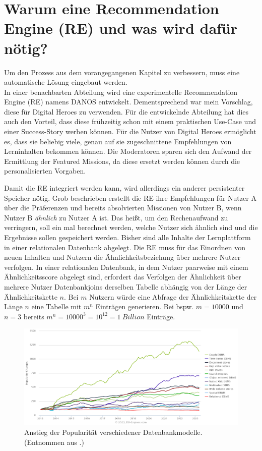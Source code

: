 \chapter{Warum eine Recommendation Engine (RE) und was wird dafür nötig?}

Um den Prozess aus dem vorangegangenen Kapitel zu verbessern, 
muss eine automatische Lösung eingebaut werden. \\
In einer benachbarten Abteilung wird eine experimentelle Recommendation Engine (RE) 
namens DANOS entwickelt. Dementsprechend war mein Vorschlag, 
diese für Digital Heroes zu verwenden. Für die entwickelnde Abteilung 
hat dies auch den Vorteil, dass diese frühzeitig schon mit einem praktischen Use-Case 
und einer Success-Story werben können. Für die Nutzer von Digital Heroes 
ermöglicht es, dass sie beliebig viele, genau auf sie zugeschnittene Empfehlungen 
von Lerninhalten bekommen können. Die Moderatoren sparen sich den Aufwand 
der Ermittlung der Featured Missions, da diese ersetzt werden können durch die 
personalisierten Vorgaben. 

Damit die RE integriert werden kann, wird allerdings ein anderer persistenter Speicher nötig.
Grob beschrieben erstellt die RE ihre Empfehlungen für Nutzer A über 
die Präferenzen und bereits absolvierten Missionen von Nutzer B, wenn Nutzer B \textit{ähnlich}
zu Nutzer A ist. Das heißt, um den Rechenaufwand zu verringern, 
soll ein mal berechnet werden, welche Nutzer sich ähnlich sind und die 
Ergebnisse sollen gespeichert werden. Bisher sind alle Inhalte der Lernplattform 
in einer relationalen Datenbank abgelegt. Die RE muss für das Einordnen 
von neuen Inhalten und Nutzern die Ähnlichkeitsbeziehung 
über mehrere Nutzer verfolgen. In einer relationalen Datenbank, 
in dem Nutzer paarweise mit einem Ähnlichkeitsscore abgelegt sind, 
erfordert das Verfolgen der Ähnlichkeit über mehrere Nutzer Datenbankjoins 
derselben Tabelle abhängig von der Länge der Ähnlichkeitskette $n$. 
Bei $m$ Nutzern würde eine Abfrage der Ähnlichkeitskette der Länge $n$ 
eine Tabelle mit $m^n$ Einträgen generieren. Bei bspw. $m = 10000$ und $n=3$ 
bereits $m^n = 10000^3 = 10^{12} = 1~Billion$ Einträge. 

\begin{figure}
	\centering
	\includegraphics[width=1.\textwidth]{Bilder/graph-db-rise-popularity.png} 
	\caption{Anstieg der Popularität verschiedener Datenbankmodelle. (Entnommen aus \cite{db-ranking}.)}
	\label{fig:db-ranking}
\end{figure} 